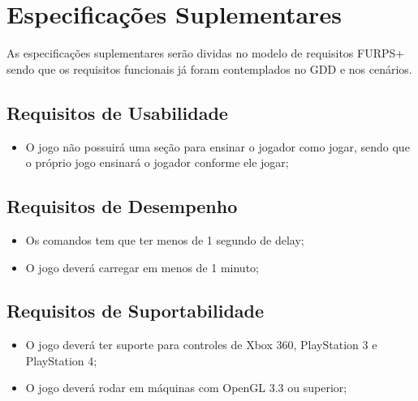 \chapter[Especificações Suplementares]{Especificações Suplementares}

As especificações suplementares serão dividas no modelo de requisitos FURPS+ sendo que os requisitos funcionais já foram contemplados no GDD e nos cenários.

\section{Requisitos de Usabilidade}

\begin{itemize}
\item O jogo não possuirá uma seção para ensinar o jogador como jogar, sendo que o próprio jogo ensinará o jogador conforme ele jogar;
\end{itemize}

\section{Requisitos de Desempenho}

\begin{itemize}
\item Os comandos tem que ter menos de 1 segundo de delay;
\item O jogo deverá carregar em menos de 1 minuto;
\end{itemize}

\section{Requisitos de Suportabilidade}

\begin{itemize}
\item O jogo deverá ter suporte para controles de Xbox 360, PlayStation 3 e PlayStation 4;
\item O jogo deverá rodar em máquinas com OpenGL 3.3 ou superior;
\end{itemize}
